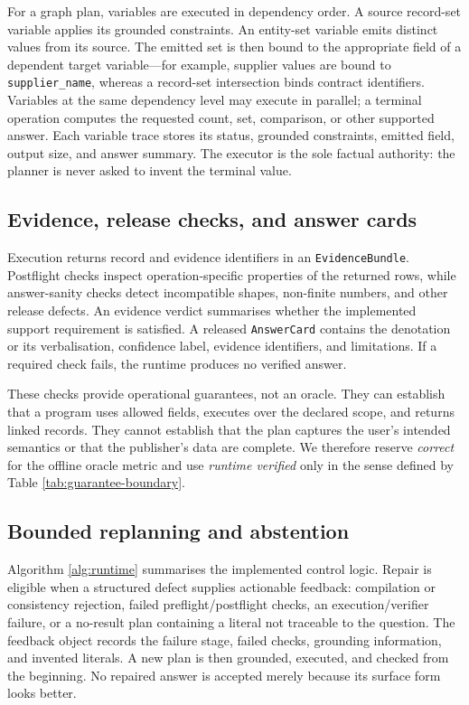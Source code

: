 For a graph plan, variables are executed in dependency order.  A source record-set variable
applies its grounded constraints.  An entity-set variable emits distinct values from its source.
The emitted set is then bound to the appropriate field of a dependent target variable---for
example, supplier values are bound to \texttt{supplier\_name}, whereas a record-set
intersection binds contract identifiers.  Variables at the same dependency level may execute in
parallel; a terminal operation computes the requested count, set, comparison, or other supported
answer.  Each variable trace stores its status, grounded constraints, emitted field, output size,
and answer summary.  The executor is the sole factual authority: the planner is never asked to
invent the terminal value.

\subsection{Evidence, release checks, and answer cards}
\label{sec:verification}

Execution returns record and evidence identifiers in an \texttt{EvidenceBundle}.  Postflight
checks inspect operation-specific properties of the returned rows, while answer-sanity checks
detect incompatible shapes, non-finite numbers, and other release defects.  An evidence verdict
summarises whether the implemented support requirement is satisfied.  A released
\texttt{AnswerCard} contains the denotation or its verbalisation, confidence label, evidence
identifiers, and limitations.  If a required check fails, the runtime produces no verified
answer.

These checks provide operational guarantees, not an oracle.  They can establish that a program
uses allowed fields, executes over the declared scope, and returns linked records.  They cannot
establish that the plan captures the user's intended semantics or that the publisher's data are
complete.  We therefore reserve \emph{correct} for the offline oracle metric and use
\emph{runtime verified} only in the sense defined by Table \ref{tab:guarantee-boundary}.

\subsection{Bounded replanning and abstention}
\label{sec:repair}

Algorithm \ref{alg:runtime} summarises the implemented control logic.  Repair is eligible when a
structured defect supplies actionable feedback: compilation or consistency rejection, failed
preflight/postflight checks, an execution/verifier failure, or a no-result plan containing a
literal not traceable to the question.  The feedback object records the failure stage, failed
checks, grounding information, and invented literals.  A new plan is then grounded, executed,
and checked from the beginning.  No repaired answer is accepted merely because its surface form
looks better.

